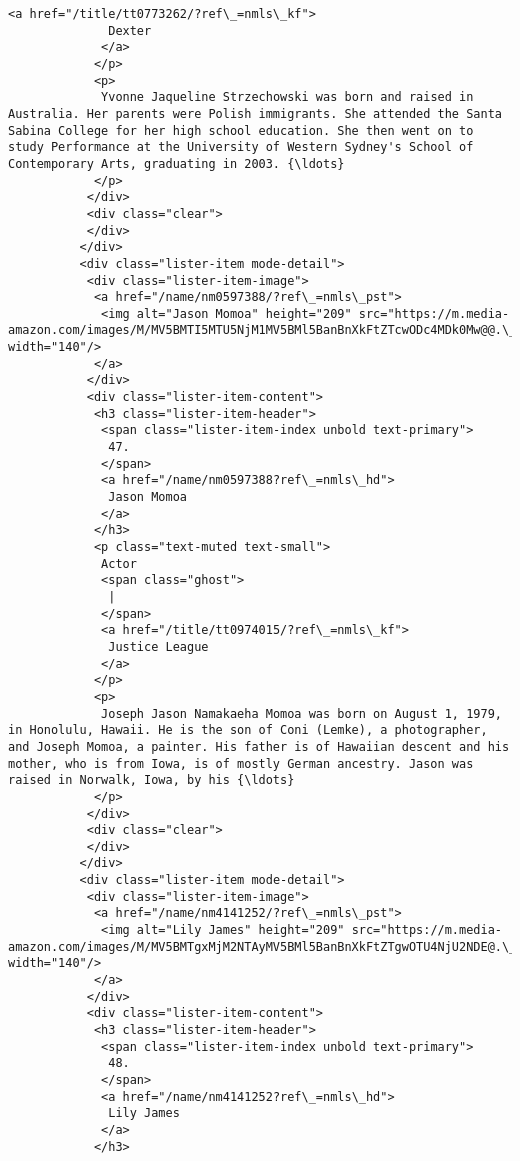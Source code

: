 \documentclass[11pt]{article}
\begin{document}
\begin{Verbatim}[commandchars=\\\{\}]
             <a href="/title/tt0773262/?ref\_=nmls\_kf">
              Dexter
             </a>
            </p>
            <p>
             Yvonne Jaqueline Strzechowski was born and raised in Australia. Her parents were Polish immigrants. She attended the Santa Sabina College for her high school education. She then went on to study Performance at the University of Western Sydney's School of Contemporary Arts, graduating in 2003. {\ldots}
            </p>
           </div>
           <div class="clear">
           </div>
          </div>
          <div class="lister-item mode-detail">
           <div class="lister-item-image">
            <a href="/name/nm0597388/?ref\_=nmls\_pst">
             <img alt="Jason Momoa" height="209" src="https://m.media-amazon.com/images/M/MV5BMTI5MTU5NjM1MV5BMl5BanBnXkFtZTcwODc4MDk0Mw@@.\_V1\_UX140\_CR0,0,140,209\_AL\_.jpg" width="140"/>
            </a>
           </div>
           <div class="lister-item-content">
            <h3 class="lister-item-header">
             <span class="lister-item-index unbold text-primary">
              47.
             </span>
             <a href="/name/nm0597388?ref\_=nmls\_hd">
              Jason Momoa
             </a>
            </h3>
            <p class="text-muted text-small">
             Actor
             <span class="ghost">
              |
             </span>
             <a href="/title/tt0974015/?ref\_=nmls\_kf">
              Justice League
             </a>
            </p>
            <p>
             Joseph Jason Namakaeha Momoa was born on August 1, 1979, in Honolulu, Hawaii. He is the son of Coni (Lemke), a photographer, and Joseph Momoa, a painter. His father is of Hawaiian descent and his mother, who is from Iowa, is of mostly German ancestry. Jason was raised in Norwalk, Iowa, by his {\ldots}
            </p>
           </div>
           <div class="clear">
           </div>
          </div>
          <div class="lister-item mode-detail">
           <div class="lister-item-image">
            <a href="/name/nm4141252/?ref\_=nmls\_pst">
             <img alt="Lily James" height="209" src="https://m.media-amazon.com/images/M/MV5BMTgxMjM2NTAyMV5BMl5BanBnXkFtZTgwOTU4NjU2NDE@.\_V1\_UX140\_CR0,0,140,209\_AL\_.jpg" width="140"/>
            </a>
           </div>
           <div class="lister-item-content">
            <h3 class="lister-item-header">
             <span class="lister-item-index unbold text-primary">
              48.
             </span>
             <a href="/name/nm4141252?ref\_=nmls\_hd">
              Lily James
             </a>
            </h3>

\end{Verbatim}
\end{document}

